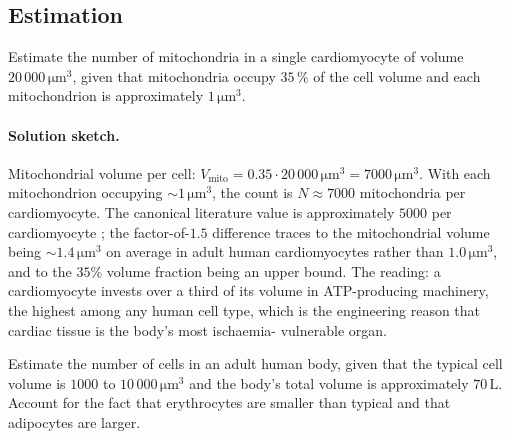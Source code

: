 \subsection*{Estimation}

\begin{exercise}
Estimate the number of mitochondria in a single cardiomyocyte of
volume $20\,000\,\si{\micro\meter}^3$, given that mitochondria
occupy $35\,\%$ of the cell volume and each mitochondrion is
approximately $1\,\si{\micro\meter}^3$.
\end{exercise}

\paragraph{Solution sketch.}
Mitochondrial volume per cell:
$V_{\text{mito}} = 0.35 \cdot 20\,000\,\si{\micro\meter}^3
= 7000\,\si{\micro\meter}^3$. With each mitochondrion occupying
$\sim 1\,\si{\micro\meter}^3$, the count is $N \approx 7000$
mitochondria per cardiomyocyte. The canonical literature value is
approximately $5000$ per cardiomyocyte \cite{text:v6c01-bionumbers-2015};
the factor-of-$1.5$ difference traces to the mitochondrial volume
being $\sim 1.4\,\si{\micro\meter}^3$ on average in adult human
cardiomyocytes rather than $1.0\,\si{\micro\meter}^3$, and to the
$35\%$ volume fraction being an upper bound. The reading: a
cardiomyocyte invests over a third of its volume in ATP-producing
machinery, the highest among any human cell type, which is the
engineering reason that cardiac tissue is the body's most ischaemia-
vulnerable organ.

\begin{exercise}
Estimate the number of cells in an adult human body, given that the
typical cell volume is $1000$ to $10\,000\,\si{\micro\meter}^3$ and
the body's total volume is approximately $70\,\text{L}$. Account for
the fact that erythrocytes are smaller than typical and that
adipocytes are larger.
\end{exercise}

